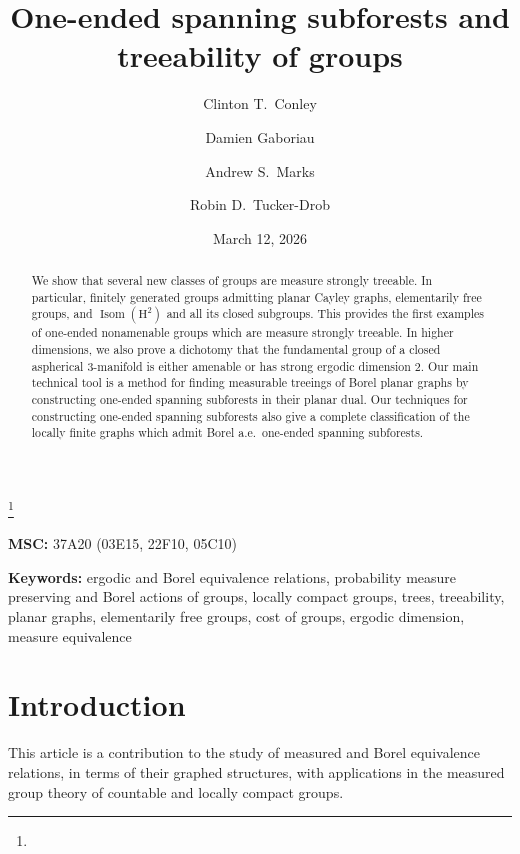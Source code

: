 \documentclass[11pt]{amsart}
\theoremstyle{definition}
\theoremstyle{plain}
\newcommand{\<}{\langle}
\renewcommand{\>}{\rangle}
\DeclareMathOperator{\Isom}{Isom}
\newcommand{\HH}{\bm{\mathrm{H}}}
\newcommand{\pmp}{\text{p.m.p.}}
\begin{document}
\title{One-ended spanning subforests and treeability of groups}

\author[Conley \and Gaboriau \and Marks \and Tucker-Drob]{Clinton T.~Conley \and Damien Gaboriau \and Andrew S.~Marks \and Robin D.~Tucker-Drob}
%
\date{March 12, 2026}
\thanks{}
%
\begin{abstract}
  We show that several new classes of groups are measure strongly treeable. In
  particular, finitely generated groups admitting planar Cayley graphs,
  elementarily free groups, and $\Isom(\HH^2)$ and all its closed subgroups. This provides the first examples of one-ended nonamenable groups which are measure strongly treeable. In
  higher dimensions, we also prove a dichotomy that the
  fundamental group of a closed aspherical $3$-manifold is either amenable or
  has strong ergodic dimension $2$. Our main technical tool is a method
  for finding measurable treeings of Borel planar graphs by constructing
  one-ended spanning subforests in their planar dual.
  Our techniques for constructing one-ended spanning subforests also give a
  complete classification of the locally finite \pmp{} graphs which
  admit Borel a.e.\ one-ended spanning subforests.
\end{abstract}

\maketitle

\tableofcontents


\noindent
\textbf{MSC:}
37A20 (03E15, 22F10, 05C10)

\noindent
\textbf{Keywords:}
{ergodic and Borel equivalence relations, probability measure preserving and Borel actions of groups, locally compact groups, trees, treeability, planar graphs, elementarily free groups, cost of groups, ergodic dimension, measure equivalence}

\addtocounter{section}{-1}
\section{Introduction}

This article is a contribution to the study of measured and Borel equivalence relations, in terms of their graphed structures, with applications in the measured group theory of countable and locally compact groups.
\end{document}
